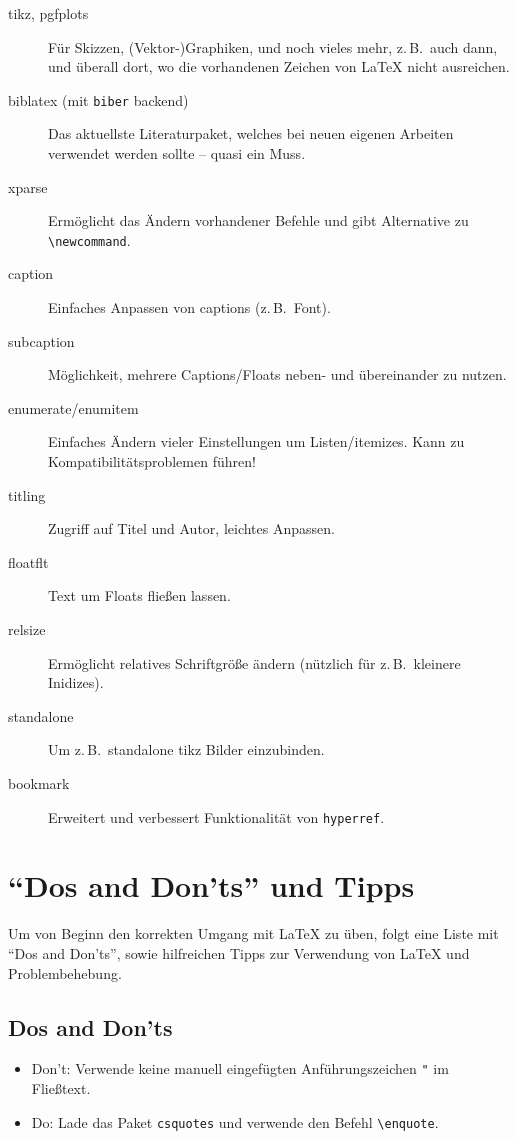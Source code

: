 \documentclass[11pt,
               a4paper,
               parskip=half,
               ]{scrartcl}
\newcommand{\zB}{z.\,B.\xspace}
\newcommand{\textsw}[1]{\texttt{#1}} %
\begin{document}
\begin{description}
  \item[tikz, pgfplots] Für Skizzen, (Vektor-)Graphiken,
    und noch vieles mehr, \zB~auch dann, und überall dort,
    wo die vorhandenen Zeichen von \LaTeX{} nicht ausreichen.

  \item[biblatex (mit \textsw{biber} backend)]
    Das aktuellste Literaturpaket,
    welches bei neuen eigenen Arbeiten verwendet werden sollte --
    quasi ein Muss.

  \item[xparse] Ermöglicht das Ändern vorhandener Befehle
    und gibt Alternative zu \verb+\newcommand+.

  \item[caption] Einfaches Anpassen von captions (\zB~Font).

  \item[subcaption] Möglichkeit, mehrere Captions/Floats
    neben- und übereinander zu nutzen.

  \item[enumerate/enumitem] Einfaches Ändern vieler Einstellungen
    um Listen/itemizes. Kann zu Kompatibilitätsproblemen führen!

  \item[titling] Zugriff auf Titel und Autor, leichtes Anpassen.

  \item[floatflt] Text um Floats fließen lassen.

  \item[relsize] Ermöglicht relatives Schriftgröße ändern
    (nützlich für \zB~kleinere Inidizes).

  \item[standalone] Um \zB~standalone tikz Bilder einzubinden.

  \item[bookmark] Erweitert und verbessert Funktionalität von \textsw{hyperref}.

\end{description}
%
\section{\enquote{Dos and Don'ts} und Tipps}
Um von Beginn den korrekten Umgang mit \LaTeX{} zu üben,
folgt eine Liste mit \enquote{Dos and Don'ts},
sowie hilfreichen Tipps zur Verwendung von \LaTeX{} und Problembehebung.
\subsection{Dos and Don'ts}
%
\begin{itemize}
  \item Don't: Verwende keine manuell eingefügten Anführungszeichen {\verb+"+} im Fließtext.
  \item Do: Lade das Paket \verb+csquotes+ und verwende den Befehl \verb+\enquote+.
\end{itemize}
\end{document}

